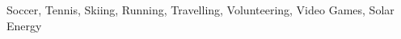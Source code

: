 \vspace{1mm}
\vspace{-3mm}

\begin{cvhonors}
  \cvhonor
    {}
    {Soccer, Tennis, Skiing, Running, Travelling, Volunteering, Video Games, Solar Energy}
    {}
    {}
  
\end{cvhonors}
